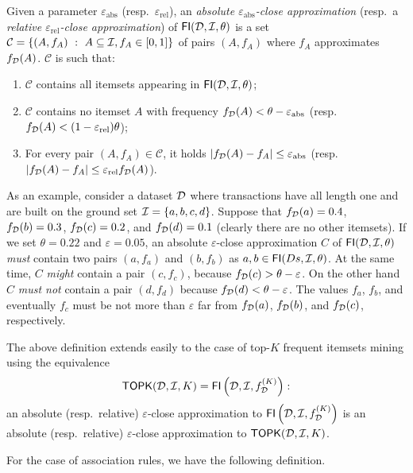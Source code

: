\begin{definition}\label{def:vcmineapproxfi}
  Given a parameter
  $\varepsilon_{\mathrm{abs}}$ (resp.~$\varepsilon_{\mathrm{rel}}$), an
  \emph{absolute $\varepsilon_{\mathrm{abs}}$-close approximation}  (resp.~a
  \emph{relative $\varepsilon_{\mathrm{rel}}$-close approximation}) of
  $\mathsf{FI}({\cal D},{\cal I},\theta)$ is a set $\mathcal{C}=\{(A, f_A) ~:~ A\subseteq{\cal I},
  f_A\in[0,1]\}$ of pairs $(A, f_A)$ where $f_A$ approximates $f_{\cal D}(A)$.
  $\mathcal{C}$ is such that:
  \begin{enumerate}
    \item $\mathcal{C}$ contains all itemsets appearing in $\mathsf{FI}({\cal D},{\cal I},\theta)$;
    \item $\mathcal{C}$ contains no itemset $A$ with frequency $f_{\cal D}(A)<\theta -
      \varepsilon_{\mathrm{abs}}$ (resp. $f_{\cal D}(A)< (1-\varepsilon_{\mathrm{rel}})\theta$);
    \item For every pair $(A, f_A)\in\mathcal{C}$, it holds
      $|f_{\cal D}(A)-f_A|\le\varepsilon_{\mathrm{abs}}$ (resp.
      $|f_{\cal D}(A)-f_A|\le\varepsilon_\mathrm{rel}f_{\cal D}(A)$).
  \end{enumerate}
\end{definition}

As an example, consider a dataset ${\cal D}$ where transactions have all length one
and are built on the ground set ${\cal I}=\{a,b,c,d\}$. Suppose that $f_{\cal D}(a)=0.4$,
$f_{\cal D}(b)=0.3$, $f_{\cal D}(c)=0.2$, and $f_{\cal D}(d)=0.1$ (clearly there are no other
itemsets). If we set $\theta=0.22$ and $\varepsilon=0.05$, an absolute
$\varepsilon$-close approximation $C$ of $\mathsf{FI}({\cal D},{\cal I},\theta)$ \emph{must}
contain two pairs $(a,f_a)$ and $(b,f_b)$ as $a,b\in\mathsf{FI}(Ds,{\cal I},\theta)$. At the
same time, $C$ \emph{might} contain a pair $(c,f_c)$, because
$f_{\cal D}(c)>\theta-\varepsilon$. On the other hand $C$ \emph{must not} contain a
pair $(d,f_d)$ because $f_{\cal D}(d)<\theta-\varepsilon$. The values $f_a$, $f_b$,
and eventually $f_c$ must be not more than $\varepsilon$ far from $f_{\cal D}(a)$,
$f_{\cal D}(b)$, and $f_{\cal D}(c)$, respectively.

The above definition extends easily to the case of top-$K$ frequent itemsets mining
using the equivalence 
\[ \mathsf{TOPK}({\cal D},{\cal I},K)=\mathsf{FI}\left({\cal D},{\cal I},f^{(K)}_{\cal D}\right):\]
an absolute (resp.~relative) $\varepsilon$-close approximation to
$\mathsf{FI}\left({\cal D},{\cal I},f^{(K)}_{\cal D}\right)$ is an absolute (resp.~relative)
$\varepsilon$-close approximation to $\mathsf{TOPK}({\cal D},{\cal I},K)$.

For the case of association rules, we have the following definition.

